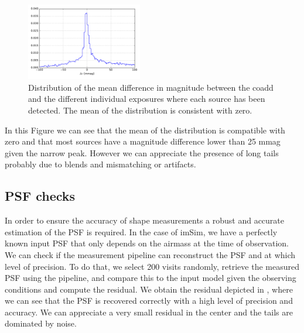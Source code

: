 \documentclass[\docopts]{\docclass}
\begin{document}
\begin{figure}
  \centering
  \includegraphics[width=0.45\textwidth]{photometry_internal_10visits_imsim_undithered}
  \caption{Distribution of the mean difference in magnitude between the coadd and the different individual exposures
  where each source has been detected. The mean of the distribution is consistent with zero.}
  \label{fig:internal_photometry_a}
\end{figure}

In this Figure we can see that the mean of the distribution is compatible with zero and that most sources have a magnitude difference lower
than 25 mmag given the narrow peak. However we can appreciate the presence of long tails probably due to blends and mismatching or artifacts.

\subsection{PSF checks}
\label{sec:psf_checks}

In order to ensure the accuracy of shape measurements a robust and accurate estimation of the PSF is required. In the case of imSim, we have
a perfectly known input PSF that only depends on the airmass at the time of observation. We can check if the measurement pipeline can reconstruct
the PSF and at which level of precision. To do that, we select 200 visits randomly, retrieve the measured PSF using the pipeline, and compare this
to the input model given the observing conditions and compute the residual. We obtain the residual depicted in , where we can see that the PSF is recovered correctly with a high level of precision and accuracy. We can appreciate a very small residual in the center and the tails are dominated by noise.
\end{document}
